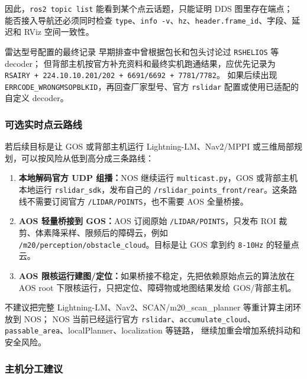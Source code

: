 \documentclass[UTF8,11pt,a4paper]{ctexart}
\begin{document}
因此，\texttt{ros2 topic list} 能看到某个点云话题，只能证明 DDS 图里存在端点；
能否接入导航还必须同时检查 \texttt{type}、\texttt{info -v}、\texttt{hz}、\texttt{header.frame\_id}、字段、延迟和 RViz 空间一致性。

\begin{orangebox}{雷达型号配置的最终记录}
早期排查中曾根据包长和包头讨论过 \texttt{RSHELIOS} 等 decoder；
但背部主机按官方补充资料和最终实机跑通结果，应优先记录为
\texttt{RSAIRY + 224.10.10.201/202 + 6691/6692 + 7781/7782}。
如果后续出现 \texttt{ERRCODE\_WRONGMSOPBLKID}，再回查厂家型号、官方 \texttt{rslidar} 配置或使用已适配的自定义 decoder。
\end{orangebox}

\subsubsection{可选实时点云路线}

若后续目标是让 GOS 或背部主机运行 Lightning-LM、Nav2/MPPI 或三维局部规划，可以按风险从低到高分成三条路线：

\begin{enumerate}
  \item \textbf{本地解码官方 UDP 组播：}NOS 继续运行 \texttt{multicast.py}，GOS 或背部主机本地运行 \texttt{rslidar\_sdk}，发布自己的 \texttt{/rslidar\_points\_front/rear}。这条路线不需要订阅官方 \texttt{/LIDAR/POINTS}，也不需要 AOS 全量桥接。
  \item \textbf{AOS 轻量桥接到 GOS：}AOS 订阅原始 \texttt{/LIDAR/POINTS}，只发布 ROI 裁剪、体素降采样、限频后的障碍云，例如 \texttt{/m20/perception/obstacle\_cloud}。目标是让 GOS 拿到约 \texttt{8-10Hz} 的轻量点云。
  \item \textbf{AOS 限核运行建图/定位：}如果桥接不稳定，先把依赖原始点云的算法放在 AOS root 下限核运行，只把定位、障碍物或地图结果发给 GOS/背部主机。
\end{enumerate}

不建议把完整 Lightning-LM、Nav2、SCAN/m20\_scan\_planner 等重计算主闭环放到 NOS；
NOS 当前已经运行官方 \texttt{rslidar}、\texttt{accumulate\_cloud}、\texttt{passable\_area}、localPlanner、localization 等链路，
继续加重会增加系统抖动和安全风险。

\subsubsection{主机分工建议}
\end{document}
